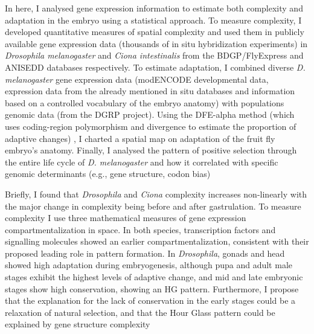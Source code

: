 \hfill\break 
In here, I analysed gene expression information to estimate both complexity and adaptation in the embryo using a statistical approach.
%
To measure complexity, I developed quantitative measures of spatial complexity and used them in publicly available gene expression data (thousands of in situ hybridization experiments) %
 in \textit{Drosophila melanogaster} and \textit{Ciona intestinalis} from the BDGP/FlyExpress and ANISEDD databases respectively.
%
To estimate adaptation, I combined diverse \textit{D. melanogaster} gene expression data (modENCODE developmental data,  expression data from the already mentioned in situ databases and information based on a controlled vocabulary of the embryo anatomy)  with populations genomic data (from the DGRP project). Using the DFE-alpha method 
(which uses coding-region polymorphism and divergence to estimate the proportion of adaptive changes)
, I charted a spatial map on adaptation of the fruit fly embryo's anatomy. 
Finally, I analysed the pattern of positive selection through the entire life cycle of \textit{D. melanogaster} and how it correlated with specific genomic determinants (e.g., gene structure, codon bias)

\hfill\break 
Briefly, I found that \textit{Drosophila} and \textit{Ciona} complexity increases non-linearly with the major change in complexity being before and after gastrulation. To measure complexity I use three mathematical measures of gene expression compartmentalization in space. 
In both species, transcription factors and signalling molecules showed an earlier compartmentalization, consistent with their proposed leading role in pattern formation.
%
In \textit{Drosophila}, gonads and head showed high adaptation during embryogenesis, although pupa and adult male stages exhibit the highest levels of adaptive change, and mid and late embryonic stages show high conservation, showing an HG pattern.
Furthermore, I propose that the explanation for the lack of conservation in the early stages could be a relaxation of natural selection, and that the Hour Glass pattern could be explained by gene structure complexity